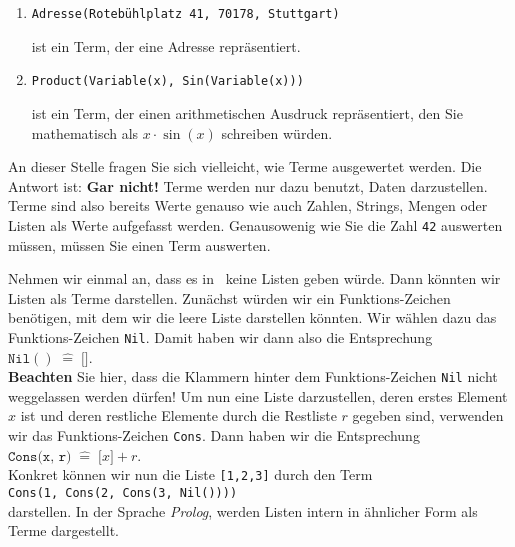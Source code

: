 \examples
\begin{enumerate}
\item \texttt{Adresse(Roteb\"{u}hlplatz 41, 70178, Stuttgart)}

      ist ein Term, der eine Adresse repr\"{a}sentiert.
\item \texttt{Product(Variable(x), Sin(Variable(x)))}

      ist ein Term, der einen arithmetischen Ausdruck repr\"{a}sentiert, den Sie mathematisch
      als $x \cdot \sin(x)$ schreiben w\"{u}rden.  \eox
\end{enumerate}

An dieser Stelle fragen Sie sich vielleicht, wie Terme ausgewertet werden.  Die Antwort ist:
\textbf{Gar nicht!}  Terme werden nur dazu benutzt, Daten darzustellen.  Terme sind also bereits 
Werte  genauso wie auch Zahlen, Strings, Mengen oder Listen als Werte aufgefasst werden.
Genausowenig wie Sie die Zahl \texttt{42} auswerten m\"{u}ssen, m\"{u}ssen Sie einen Term auswerten.

Nehmen wir einmal an,
dass es in \setl\ keine Listen geben w\"{u}rde.  Dann k\"{o}nnten wir Listen als Terme darstellen.  Zun\"{a}chst
w\"{u}rden wir ein Funktions-Zeichen ben\"{o}tigen, mit dem wir die leere Liste darstellen k\"{o}nnten.  Wir
w\"{a}hlen dazu das Funktions-Zeichen \texttt{Nil}.  Damit haben wir dann also die Entsprechung
\\[0.2cm]
\hspace*{1.3cm}
$\texttt{Nil}() \;\widehat{=}\; \texttt{[]}$.
\\[0.2cm]
\textbf{Beachten} Sie hier, dass die Klammern hinter dem Funktions-Zeichen \texttt{Nil} nicht
weggelassen werden d\"{u}rfen!  Um nun eine Liste darzustellen, deren erstes Element $x$ ist und deren
restliche Elemente durch die Restliste $r$ gegeben sind, verwenden wir das Funktions-Zeichen
\texttt{Cons}.  Dann haben wir die Entsprechung
\\[0.2cm]
\hspace*{1.3cm}
$\texttt{Cons(x, r)} \;\widehat{=}\; \texttt{[}x\texttt{]}+r$. 
\\[0.2cm]
Konkret k\"{o}nnen wir nun die Liste \texttt{[1,2,3]} durch den Term
\\[0.2cm]
\hspace*{1.3cm}
\texttt{Cons(1, Cons(2, Cons(3, Nil())))}
\\[0.2cm]
darstellen.  In der Sprache \textsl{Prolog}, werden Listen intern in \"{a}hnlicher Form als Terme dargestellt.

